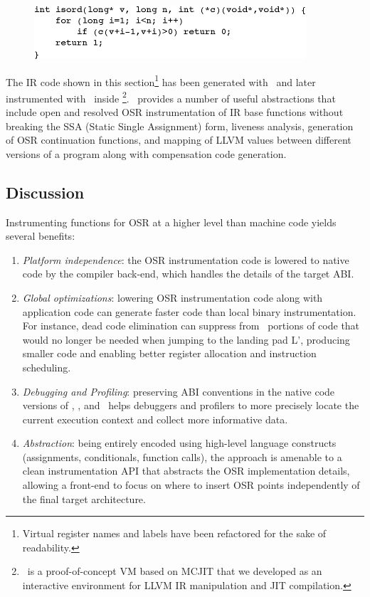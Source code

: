 \ifdefined\noauthorea
\begin{figure}[t]
\begin{center}
\includegraphics[width=0.9\textwidth]{figures/osr-isord/osr-isord.eps}
\caption{\protect}
\end{center}
\end{figure}
\fi

\noindent The IR code shown in this section\footnote{Virtual register names and labels have been refactored for the sake of readability.} has been generated with \clang\ and later instrumented with \osrkit\ inside \tinyvm\footnote{\tinyvm\ is a proof-of-concept VM based on MCJIT that we developed as an interactive environment for LLVM IR manipulation and JIT compilation.}. \osrkit\ provides a number of useful abstractions that include open and resolved OSR instrumentation of IR base functions without breaking the SSA (Static Single Assignment) form, liveness analysis, generation of OSR continuation functions, and mapping of LLVM values between different versions of a program along with compensation code generation.

\subsection{Discussion}
Instrumenting functions for OSR at a higher level than machine code yields several benefits: 
\begin{enumerate}[parsep=0pt]
\item {\em Platform independence}: the OSR instrumentation code is lowered to native code by the compiler back-end, which handles the details of the target ABI. 
\item {\em Global optimizations}: lowering OSR instrumentation code along with application code can generate faster code than local binary instrumentation. For instance, dead code elimination can suppress from \fosrto\ portions of code that would no longer be needed when jumping to the landing pad \textsf{L'}, producing smaller code and enabling better register allocation and instruction scheduling.
\item {\em Debugging and Profiling}: preserving ABI conventions in the native code versions of \fosrfrom, \fstub, and \fosrto\ helps debuggers and profilers to more precisely locate the current execution context and collect more informative data.
\item {\em Abstraction}: being entirely encoded using high-level language constructs (assignments, conditionals, function calls), the approach is amenable to a clean instrumentation API that abstracts the OSR implementation details, allowing a front-end to focus on where to insert OSR points independently of the final target architecture.
\end{enumerate}

